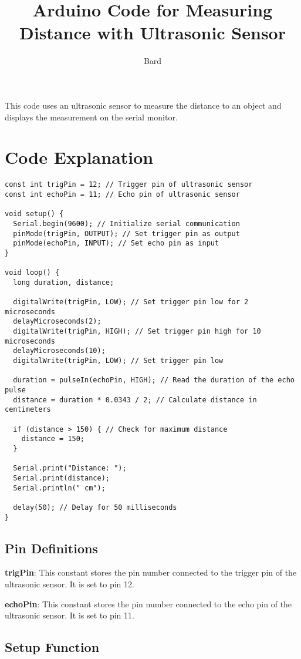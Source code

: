 \documentclass{article}
\title{Arduino Code for Measuring Distance with Ultrasonic Sensor}
\author{Bard}
\date{}
\begin{document}
\maketitle

This code uses an ultrasonic sensor to measure the distance to an object and displays the measurement on the serial monitor.

\section{Code Explanation}

\begin{verbatim}
const int trigPin = 12; // Trigger pin of ultrasonic sensor
const int echoPin = 11; // Echo pin of ultrasonic sensor

void setup() {
  Serial.begin(9600); // Initialize serial communication
  pinMode(trigPin, OUTPUT); // Set trigger pin as output
  pinMode(echoPin, INPUT); // Set echo pin as input
}

void loop() {
  long duration, distance;

  digitalWrite(trigPin, LOW); // Set trigger pin low for 2 microseconds
  delayMicroseconds(2);
  digitalWrite(trigPin, HIGH); // Set trigger pin high for 10 microseconds
  delayMicroseconds(10);
  digitalWrite(trigPin, LOW); // Set trigger pin low

  duration = pulseIn(echoPin, HIGH); // Read the duration of the echo pulse
  distance = duration * 0.0343 / 2; // Calculate distance in centimeters

  if (distance > 150) { // Check for maximum distance
    distance = 150;
  }

  Serial.print("Distance: ");
  Serial.print(distance);
  Serial.println(" cm");

  delay(50); // Delay for 50 milliseconds
}
\end{verbatim}

\subsection{Pin Definitions}

\textbf{trigPin}: This constant stores the pin number connected to the trigger pin of the ultrasonic sensor. It is set to pin 12.

\textbf{echoPin}: This constant stores the pin number connected to the echo pin of the ultrasonic sensor. It is set to pin 11.

\subsection{Setup Function}
\end{document}

